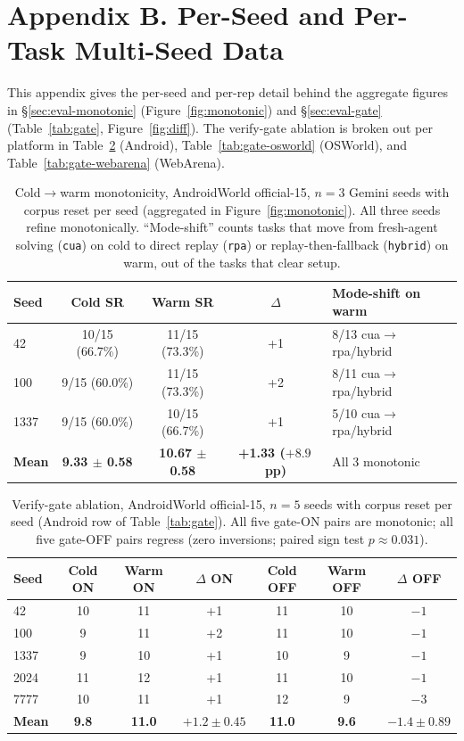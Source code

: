 \documentclass[11pt]{article}
\begin{document}
\section*{Appendix B. Per-Seed and Per-Task Multi-Seed Data}

This appendix gives the per-seed and per-rep detail behind the aggregate figures in \S\ref{sec:eval-monotonic} (Figure~\ref{fig:monotonic}) and \S\ref{sec:eval-gate} (Table~\ref{tab:gate}, Figure~\ref{fig:diff}). The verify-gate ablation is broken out per platform in Table~\ref{tab:gate-android} (Android), Table~\ref{tab:gate-osworld} (OSWorld), and Table~\ref{tab:gate-webarena} (WebArena).

\begin{table}[h]
\centering
\caption{Cold$\to$warm monotonicity, AndroidWorld official-15, $n{=}3$ Gemini seeds with corpus reset per seed (aggregated in Figure~\ref{fig:monotonic}). All three seeds refine monotonically. ``Mode-shift'' counts tasks that move from fresh-agent solving (\texttt{cua}) on cold to direct replay (\texttt{rpa}) or replay-then-fallback (\texttt{hybrid}) on warm, out of the tasks that clear setup.}
\label{tab:monotonic}
\begin{tabular}{@{}lcccl@{}}
\toprule
Seed & Cold SR & Warm SR & $\Delta$ & Mode-shift on warm \\
\midrule
42 & 10/15 (66.7\%) & 11/15 (73.3\%) & +1 & 8/13 cua$\to$rpa/hybrid \\
100 & 9/15 (60.0\%) & 11/15 (73.3\%) & +2 & 8/11 cua$\to$rpa/hybrid \\
1337 & 9/15 (60.0\%) & 10/15 (66.7\%) & +1 & 5/10 cua$\to$rpa/hybrid \\
\midrule
\textbf{Mean} & \textbf{9.33 $\pm$ 0.58} & \textbf{10.67 $\pm$ 0.58} & \textbf{+1.33 ($+8.9$\,pp)} & All 3 monotonic \\
\bottomrule
\end{tabular}
\end{table}

\begin{table}[h]
\centering
\caption{Verify-gate ablation, AndroidWorld official-15, $n{=}5$ seeds with corpus reset per seed (Android row of Table~\ref{tab:gate}). All five gate-ON pairs are monotonic; all five gate-OFF pairs regress (zero inversions; paired sign test $p \approx 0.031$).}
\label{tab:gate-android}
\begin{tabular}{@{}lcccccc@{}}
\toprule
Seed & Cold ON & Warm ON & $\Delta$ ON & Cold OFF & Warm OFF & $\Delta$ OFF \\
\midrule
42 & 10 & 11 & +1 & 11 & 10 & $-1$ \\
100 & 9 & 11 & +2 & 11 & 10 & $-1$ \\
1337 & 9 & 10 & +1 & 10 & 9 & $-1$ \\
2024 & 11 & 12 & +1 & 11 & 10 & $-1$ \\
7777 & 10 & 11 & +1 & 12 & 9 & $-3$ \\
\midrule
\textbf{Mean} & \textbf{9.8} & \textbf{11.0} & \textbf{$+1.2 \pm 0.45$} & \textbf{11.0} & \textbf{9.6} & \textbf{$-1.4 \pm 0.89$} \\
\bottomrule
\end{tabular}
\end{table}
\end{document}
